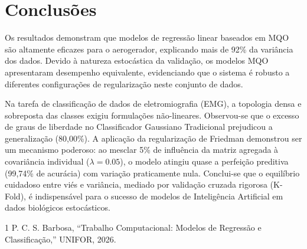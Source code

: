 \documentclass[journal,onecolumn]{IEEEtran}
\begin{document}
\section{Conclusões}
Os resultados demonstram que modelos de regressão linear baseados em MQO são altamente eficazes para o aerogerador, explicando mais de 92\% da variância dos dados. Devido à natureza estocástica da validação, os modelos MQO apresentaram desempenho equivalente, evidenciando que o sistema é robusto a diferentes configurações de regularização neste conjunto de dados.

Na tarefa de classificação de dados de eletromiografia (EMG), a topologia densa e sobreposta das classes exigiu formulações não-lineares. Observou-se que o excesso de graus de liberdade no Classificador Gaussiano Tradicional prejudicou a generalização (80,00\%). A aplicação da regularização de Friedman demonstrou ser um mecanismo poderoso: ao mesclar 5\% de influência da matriz agregada à covariância individual ($\lambda=0.05$), o modelo atingiu quase a perfeição preditiva (99,74\% de acurácia) com variação praticamente nula. Conclui-se que o equilíbrio cuidadoso entre viés e variância, mediado por validação cruzada rigorosa (K-Fold), é indispensável para o sucesso de modelos de Inteligência Artificial em dados biológicos estocásticos.

\begin{thebibliography}{1}
P. C. S. Barbosa, ``Trabalho Computacional: Modelos de Regressão e Classificação,'' UNIFOR, 2026.
\end{thebibliography}
\end{document}
